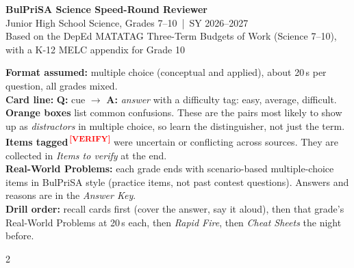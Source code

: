 \documentclass[10pt,a4paper]{article}
\begin{document}
\begin{center}
  {\LARGE\bfseries BulPriSA Science Speed-Round Reviewer}\\[3pt]
  {\large Junior High School Science, Grades 7--10 \,|\, SY 2026--2027}\\[2pt]
  {\small Based on the DepEd MATATAG Three-Term Budgets of Work (Science 7--10), with a K-12 MELC appendix for Grade 10}
\end{center}

\begin{tcolorbox}[colback=gray!5,colframe=gray!60!black,boxrule=0.4pt,arc=1pt,
  left=4pt,right=4pt,top=2pt,bottom=2pt,fontupper=\small,title=How to read this reviewer]
\textbf{Format assumed:} multiple choice (conceptual and applied), about 20\,s per question, all grades mixed.\\
\textbf{Card line:} \textbf{Q:} cue $\rightarrow$ \textbf{A:} \textit{answer} with a difficulty tag:
 easy,  average,  difficult.\\
\textbf{Orange boxes} list common confusions. These are the pairs most likely to show up as \emph{distractors} in multiple choice, so learn the distinguisher, not just the term.\\
\textbf{Items tagged}\textsuperscript{\,\textcolor{red}{\textbf{[VERIFY]}}} were uncertain or conflicting across sources. They are collected in \emph{Items to verify} at the end.\\
\textbf{Real-World Problems:} each grade ends with scenario-based multiple-choice items in BulPriSA style (practice items, not past contest questions). Answers and reasons are in the \emph{Answer Key}.\\
\textbf{Drill order:} recall cards first (cover the answer, say it aloud), then that grade's Real-World Problems at 20\,s each, then \emph{Rapid Fire}, then \emph{Cheat Sheets} the night before.
\end{tcolorbox}

{\small
\setcounter{tocdepth}{2}
\begin{multicols}{2}
\tableofcontents
\end{multicols}
}

\pagestyle{fancy}
\fancyhf{}
\renewcommand{\headrulewidth}{0.4pt}
\fancyhead[L]{\small\bfseries\leftmark}
\fancyhead[R]{\small\rightmark}
\fancyfoot[C]{\small\thepage}
\renewcommand{\sectionmark}[1]{\markboth{#1}{}}
\renewcommand{\subsectionmark}[1]{\markright{#1}}

\clearpage


\clearpage


\clearpage


\clearpage


\clearpage

\clearpage
\answerkey
\clearpage

\clearpage

\clearpage
\listofverify
\end{document}
